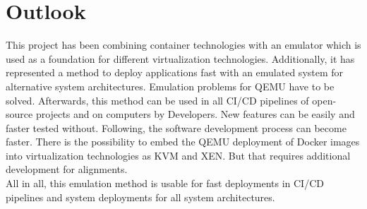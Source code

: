 \chapter{Outlook}\label{ch:outlook}

This project has been combining container technologies with an emulator which is used as a foundation for different virtualization technologies. 
Additionally, it has represented a method to deploy applications fast with an emulated system for alternative system architectures.
Emulation problems for QEMU have to be solved. Afterwards, this method can be used in all CI/CD pipelines of open-source projects and on computers by Developers.
New features can be easily and faster tested without. Following, the software development process can become faster.
There is the possibility to embed the QEMU deployment of Docker images into virtualization technologies as KVM and XEN.
But that requires additional development for alignments. \\
All in all, this emulation method is usable for fast deployments in CI/CD pipelines and system deployments for all system architectures.